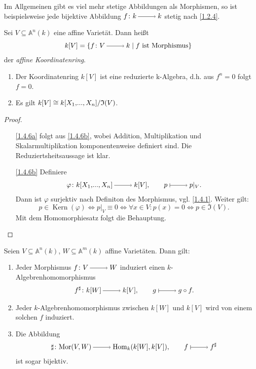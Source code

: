 \documentclass[a4paper,12pt]{scrbook}
\theoremstyle{keinenummern} %
\theoremstyle{mitnummern}
\theoremstyle{unserbeweis}
\newtheorem{proof}{Beweis}
\def\A{\mathbb{A}}
\def\I{\mathfrak{I}}
\newcommand{\Hom}{\mathrm{Hom}}
\newcommand{\Mor}{\mathrm{Mor}}
\newcommand{\Kern}{\operatorname{Kern}}
\renewcommand{\phi}{\varphi}
\newcommand{\restrict}[1]{|_{#1}}
\renewcommand{\dotsc}{\ensuremath{\!...}}
\newcommand{\ra}{\raisebox{-1pt}{\tikz{\draw[thin,shorten >=3pt, ->] (0,0) node{\hspace*{-2pt}} -- node{} (1,0);}}\penalty1000\relax}
\renewcommand{\mapsto}{\raisebox{-1pt}{\tikz{\draw[thin,shorten >=3pt, |->] (0,0) node{\hspace*{0pt}} -- node{} (1,0);}}\penalty1000\relax}
\newcommand{\Quotient}[2]{
  \mathchoice
  { %
    \raisebox{0.7ex}{\ensuremath{#1}}
    \ensuremath{\mkern-3mu}\big/\ensuremath{\mkern-3mu}
    \raisebox{-0.6ex}{\ensuremath{#2}}
  }
  { %
    #1/#2
  }
  { %
    #1/#2
  }
  { %
    #1/#2
  }
}
\newcommand{\polyx}[1][n]{\ensuremath%
  [X_{1},\dotsc,X_{#1}]}
\begin{document}
\begin{w}
Im Allgemeinen gibt es viel mehr stetige Abbildungen als Morphismen, so ist beispielsweise jede bijektive Abbildung $f\colon k\ra k$ stetig nach \cref{1.2.4}.
\end{w}

\begin{dfn}\label{1.4.5}
Sei $V\subseteq \A^n(k)$ eine affine Varietät. Dann heißt 
\[k[V]=\{f\colon V\ra k \mid f\text{ ist Morphismus\}}\]
 der \emph{affine Koordinatenring}.
\end{dfn}

\begin{bem}
\begin{enumerate}
\item{} Der Koordinatenring $k[V]$ ist eine reduzierte k-Algebra, d.h. aus $f^n=0$ folgt $f=0$.
\item{} Es gilt $k[V] \cong \Quotient{k\polyx}{\I(V)}$.
\end{enumerate}
\end{bem}

\begin{proof}
\begin{enumerate}
\item[\ref{1.4.6a}] folgt aus \ref{1.4.6b}, wobei Addition, Multiplikation und Skalarmultiplikation komponentenweise definiert sind. Die Reduziertsheitsaussage ist klar.
\item[\ref{1.4.6b}] Definiere
\[\phi\colon  k\polyx\ra k[V],  \qquad p\mapsto p\restrict{V}.\]
Dann ist $\phi$ surjektiv nach Definiton des Morphismus, vgl. \cref{1.4.1}. Weiter gilt:
\[p \in \Kern(\phi) \iff p\restrict{V} \equiv 0 \iff \forall x\in V\colon p(x)=0 \iff p\in \I(V).\] 
Mit dem Homomorphiesatz folgt die Behauptung. 
\end{enumerate}
\end{proof}

\begin{bem}\label{1.4.7} Seien $V\subseteq \A^n(k)$, $W\subseteq \A^m(k)$ affine Varietäten. Dann gilt:
\begin{enumerate}
\item{} Jeder Morphismus $f\colon V\ra W$ induziert einen $k$-Algebrenhomomorphismus
\[f^\sharp\colon  k[W]\ra k[V], \qquad g\mapsto g\circ f.\]
\item{} Jeder $k$-Algebrenhomomorphismus zwischen $k[W]$ und $k[V]$ wird von einem solchen $f$ induziert.
\item{} Die Abbildung 
\[\sharp\colon \Mor(V,W)\ra \Hom_k(k[W],k[V]), \qquad f\mapsto f^{\sharp}\]
ist sogar bijektiv.
\end{enumerate}
\end{bem}
\end{document}
